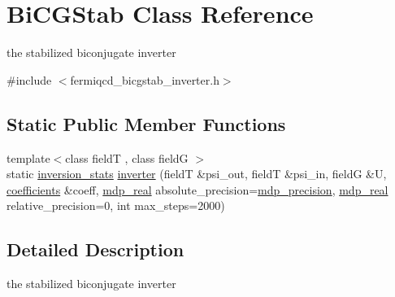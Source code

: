 \hypertarget{class_bi_c_g_stab}{}\section{Bi\+C\+G\+Stab Class Reference}
\label{class_bi_c_g_stab}


the stabilized biconjugate inverter  




{\ttfamily \#include $<$fermiqcd\+\_\+bicgstab\+\_\+inverter.\+h$>$}

\subsection*{Static Public Member Functions}
\begin{DoxyCompactItemize}
\item 
{\footnotesize template$<$class fieldT , class fieldG $>$ }\\static \hyperlink{classinversion__stats}{inversion\+\_\+stats} \hyperlink{class_bi_c_g_stab_a8f624e7cfd990e7008ae9d0aa88feaeb}{inverter} (fieldT \&psi\+\_\+out, fieldT \&psi\+\_\+in, fieldG \&U, \hyperlink{classcoefficients}{coefficients} \&coeff, \hyperlink{mdp__global__vars_8h_a69d96b74c791e0bbdb888b3913a69450}{mdp\+\_\+real} absolute\+\_\+precision=\hyperlink{mdp__global__vars_8h_a443a4ca745298420893e113a7ac926a9}{mdp\+\_\+precision}, \hyperlink{mdp__global__vars_8h_a69d96b74c791e0bbdb888b3913a69450}{mdp\+\_\+real} relative\+\_\+precision=0, int max\+\_\+steps=2000)
\end{DoxyCompactItemize}


\subsection{Detailed Description}
the stabilized biconjugate inverter 

